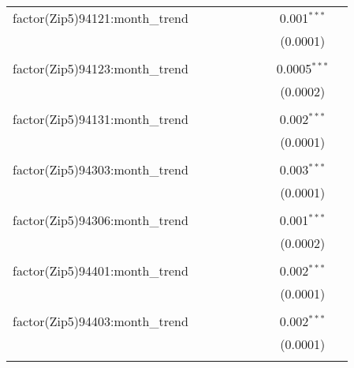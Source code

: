 \begin{table}[H]
{\begin{tabular}{@{\extracolsep{5pt}}lcccccccc}
  factor(Zip5)94121:month\_trend &  &  &  &  &  &  & 0.001$^{***}$ &  \\  

   &  &  &  &  &  &  & (0.0001) &  \\  

   & & & & & & & & \\  

  factor(Zip5)94123:month\_trend &  &  &  &  &  &  & 0.0005$^{***}$ &  \\  

   &  &  &  &  &  &  & (0.0002) &  \\  

   & & & & & & & & \\  

  factor(Zip5)94131:month\_trend &  &  &  &  &  &  & 0.002$^{***}$ &  \\  

   &  &  &  &  &  &  & (0.0001) &  \\  

   & & & & & & & & \\  

  factor(Zip5)94303:month\_trend &  &  &  &  &  &  & 0.003$^{***}$ &  \\  

   &  &  &  &  &  &  & (0.0001) &  \\  

   & & & & & & & & \\  

  factor(Zip5)94306:month\_trend &  &  &  &  &  &  & 0.001$^{***}$ &  \\  

   &  &  &  &  &  &  & (0.0002) &  \\  

   & & & & & & & & \\  

  factor(Zip5)94401:month\_trend &  &  &  &  &  &  & 0.002$^{***}$ &  \\  

   &  &  &  &  &  &  & (0.0001) &  \\  

   & & & & & & & & \\  

  factor(Zip5)94403:month\_trend &  &  &  &  &  &  & 0.002$^{***}$ &  \\  

   &  &  &  &  &  &  & (0.0001) &  \\  

   & & & & & & & & \\  


\end{tabular}}
\end{table}

